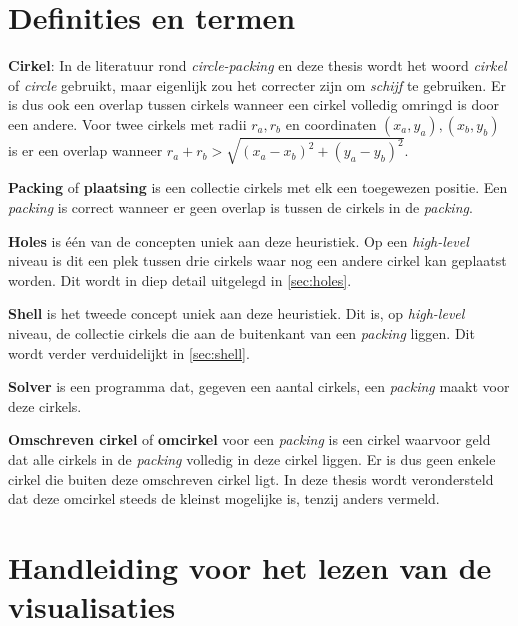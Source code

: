 \documentclass[12pt,a4paper,oneside]{book}
\begin{document}

\chapter{Definities en termen} \label{chap:definities}

\textbf{Cirkel}: In de literatuur rond \textit{circle-packing} en deze thesis wordt het woord \textit{cirkel} of \textit{circle} gebruikt, maar eigenlijk zou het correcter zijn om \textit{schijf} te gebruiken.
Er is dus ook een overlap tussen cirkels wanneer een cirkel volledig omringd is door een andere.
Voor twee cirkels met radii $r_a, r_b$ en coordinaten  $(x_a,y_a), (x_b,y_b)$ is er een overlap wanneer $r_a + r_b > \sqrt{(x_a-x_b)^2 + (y_a-y_b)^2}$. 

\textbf{Packing} of \textbf{plaatsing} is een collectie cirkels met elk een toegewezen positie. Een \textit{packing} is correct wanneer er geen overlap is tussen de cirkels in de \textit{packing}.

\textbf{Holes} is één van de concepten uniek aan deze heuristiek. Op een \textit{high-level} niveau is dit een plek tussen drie cirkels waar nog een andere cirkel kan geplaatst worden. Dit wordt in diep detail uitgelegd in \autoref{sec:holes}.

\textbf{Shell} is het tweede concept uniek aan deze heuristiek. Dit is, op \textit{high-level} niveau, de collectie cirkels die aan de buitenkant van een \textit{packing} liggen. Dit wordt verder verduidelijkt in \autoref{sec:shell}.

\textbf{Solver} is een programma dat, gegeven een aantal cirkels, een \textit{packing} maakt voor deze cirkels.

\textbf{Omschreven cirkel} of \textbf{omcirkel} voor een \textit{packing} is een cirkel waarvoor geld dat alle cirkels in de \textit{packing} volledig in deze cirkel liggen.
Er is dus geen enkele cirkel die buiten deze omschreven cirkel ligt.
In deze thesis wordt verondersteld dat deze omcirkel steeds de kleinst mogelijke is, tenzij anders vermeld.

\chapter{Handleiding voor het lezen van de visualisaties} \label{chap:handleiding-visualisaties}
\end{document}
